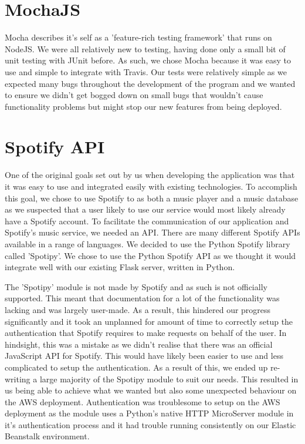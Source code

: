\section{MochaJS}
Mocha describes it's self as a 'feature-rich testing framework' that runs on NodeJS. We were all relatively new to testing, having done only a small bit of unit testing with JUnit before. As such, we chose Mocha because it was easy to use and simple to integrate with Travis. 
Our tests were relatively simple as we expected many bugs throughout the development of the program and we wanted to ensure we didn't get bogged down on small bugs that wouldn't cause functionality problems but might stop our new features from being deployed.

\section{Spotify API}
One of the original goals set out by us when developing the application was that it was easy to use and integrated easily with existing technologies. To accomplish this goal, we chose to use Spotify to as both a music player and a music database as we suspected that a user likely to use our service would most likely already have a Spotify account. 
To facilitate the communication of our application and Spotify's music service, we needed an API. There are many different Spotify APIs available in a range of languages. We decided to use the Python Spotify library called 'Spotipy'. We chose to use the Python Spotify API as we thought it would integrate well with our existing Flask server, written in Python.

The 'Spotipy' module is not made by Spotify and as such is not officially supported. This meant that documentation for a lot of the functionality was lacking and was largely user-made. As a result, this hindered our progress significantly and it took an unplanned for amount of time to correctly setup the authentication that Spotify requires to make requests on behalf of the user. In hindsight, this was a mistake as we didn't realise that there was an official JavaScript API for Spotify. 
This would have likely been easier to use and less complicated to setup the authentication. As a result of this, we ended up re-writing a large majority of the Spotipy module to suit our needs. This resulted in us being able to achieve what we wanted but also some unexpected behaviour on the AWS deployment. Authentication was troublesome to setup on the AWS deployment as the module uses a Python's native HTTP MicroServer module in it's authentication process and it had trouble running consistently on our Elastic Beanstalk environment.

